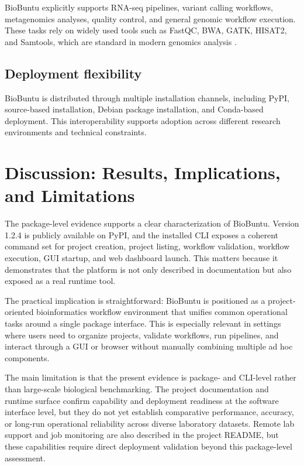 \documentclass[10pt,conference]{IEEEtran}
\begin{document}
BioBuntu explicitly supports RNA-seq pipelines, variant calling workflows, metagenomics analyses, quality control, and general genomic workflow execution. These tasks rely on widely used tools such as FastQC, BWA, GATK, HISAT2, and Samtools, which are standard in modern genomics analysis \cite{bolger2014trimmomatic, langmead2012bowtie2, mckenna2010gatk, li2009samtools, dobin2013star, danecek2011vcftools}.

\subsection{Deployment flexibility}

BioBuntu is distributed through multiple installation channels, including PyPI, source-based installation, Debian package installation, and Conda-based deployment. This interoperability supports adoption across different research environments and technical constraints.

\section{Discussion: Results, Implications, and Limitations}

The package-level evidence supports a clear characterization of BioBuntu. Version 1.2.4 is publicly available on PyPI, and the installed CLI exposes a coherent command set for project creation, project listing, workflow validation, workflow execution, GUI startup, and web dashboard launch. This matters because it demonstrates that the platform is not only described in documentation but also exposed as a real runtime tool.

The practical implication is straightforward: BioBuntu is positioned as a project-oriented bioinformatics workflow environment that unifies common operational tasks around a single package interface. This is especially relevant in settings where users need to organize projects, validate workflows, run pipelines, and interact through a GUI or browser without manually combining multiple ad hoc components.

The main limitation is that the present evidence is package- and CLI-level rather than large-scale biological benchmarking. The project documentation and runtime surface confirm capability and deployment readiness at the software interface level, but they do not yet establish comparative performance, accuracy, or long-run operational reliability across diverse laboratory datasets. Remote lab support and job monitoring are also described in the project README, but these capabilities require direct deployment validation beyond this package-level assessment.
\end{document}
